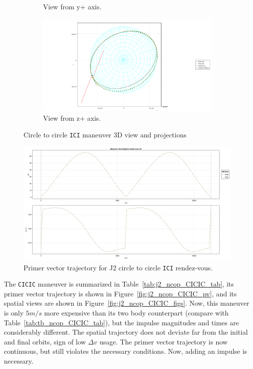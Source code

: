 \begin{figure}[htbp]
\begin{subfigure}{0.49\linewidth}
        \caption{View from y+ axis.}
    \end{subfigure}
    \begin{subfigure}{0.49\linewidth}
        \includegraphics[width=\linewidth]{../results/j2/ipv_noncop/ICI_z+.png}
        \caption{View from z+ axis.}
    \end{subfigure}
    \caption{Circle to circle \texttt{ICI} maneuver 3D view and projections}
    \label{fig:j2_ncop_ICI_figs}
\end{figure}

\begin{figure}[htbp]
    \centering
    \includegraphics[width=\linewidth]{../results/j2/ipv_noncop/ICI_primer_vector.png}
    \caption{Primer vector trajectory for J2 circle to circle \texttt{ICI} rendez-vous.}
    \label{fig:j2_ncop_ICI_pv}
\end{figure}

The \texttt{CICIC} maneuver is summarized in Table~\ref{tab:j2_ncop_CICIC_tab}, its primer vector trajectory is shown in Figure~\ref{fig:j2_ncop_CICIC_pv}, and its spatial views are shown in Figure~\ref{fig:j2_ncop_CICIC_figs}. Now, this maneuver is only \(5 m/s\) more expensive than its two body counterpart (compare with Table~\ref{tab:tb_ncop_CICIC_tab}), but the impulse magnitudes and times are considerably different. The spatial trajectory does not deviate far from the initial and final orbits, sign of low \(\Delta v\) usage. The primer vector trajectory is now continuous, but still violates the necessary conditions. Now, adding an impulse is necessary.

